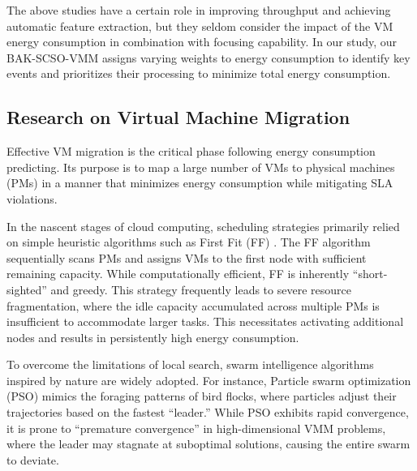 \documentclass[conference]{{IEEEtran}}
\begin{document}
The above studies have a certain role in improving throughput and achieving automatic feature extraction, but they seldom consider the impact of the VM energy consumption in combination with focusing capability. In our study, our BAK-SCSO-VMM assigns varying weights to energy consumption to identify key events and prioritizes their processing to minimize total energy consumption.

\subsection{Research on Virtual Machine Migration}

Effective VM migration is the critical phase following energy consumption predicting. Its purpose is to map a large number of VMs to physical machines (PMs) in a manner that minimizes energy consumption while mitigating SLA violations\cite{lella2024towards}.

In the nascent stages of cloud computing, scheduling strategies primarily relied on simple heuristic algorithms such as First Fit (FF)\cite{du2024metaheuristic} . The FF algorithm sequentially scans PMs and assigns VMs to the first node with sufficient remaining capacity. While computationally efficient, FF is inherently “short-sighted” and greedy. This strategy frequently leads to severe resource fragmentation, where the idle capacity accumulated across multiple PMs is insufficient to accommodate larger tasks. This necessitates activating additional nodes and results in persistently high energy consumption\cite{song2024predicting}.

To overcome the limitations of local search, swarm intelligence algorithms inspired by nature are widely adopted. For instance, Particle swarm optimization (PSO)\cite{rhif2023veg} mimics the foraging patterns of bird flocks, where particles adjust their trajectories based on the fastest “leader.” While PSO exhibits rapid convergence, it is prone to “premature convergence” in high-dimensional VMM problems, where the leader may stagnate at suboptimal solutions, causing the entire swarm to deviate.
\end{document}
